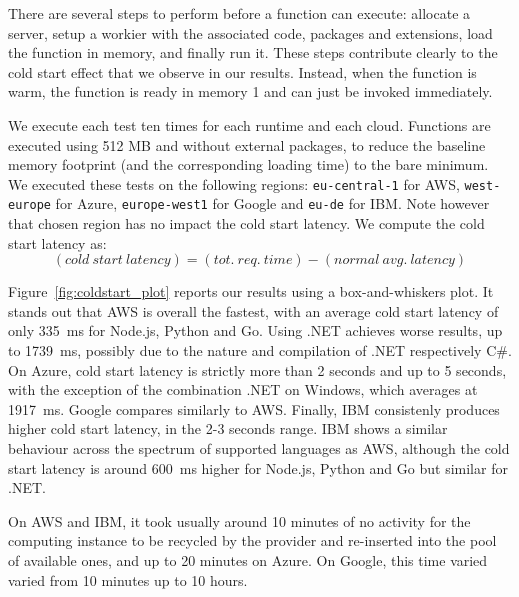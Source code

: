 There are several steps to perform before a function can execute: allocate a server, setup a workier with the associated code, packages and extensions, load the function in memory, and finally run it.
These steps contribute clearly to the cold start effect that we observe in our results.
Instead, when the function is warm, the function is ready in memory	1 and can just be invoked immediately. 

We execute each test ten times for each runtime and each cloud. 
Functions are executed using 512 \gls{MB} and without external packages, to reduce the baseline memory footprint (and the corresponding loading time) to the bare minimum.
We executed these tests on the following regions: \texttt{eu-central-1} for AWS,  \texttt{west-europe} for Azure,  \texttt{europe-west1} for Google and \texttt{eu-de} for IBM. 
Note however that chosen region has no impact the cold start latency. 
We compute the cold start latency as:
\begin{equation*}
(cold\ start\ latency) = (tot.\ req.\ time) - (normal\ avg.\ latency)
\end{equation*}

Figure~\ref{fig:coldstart_plot} reports our results using a box-and-whiskers plot.
It stands out that \gls{AWS} is overall the fastest, with an average cold start latency of only 335~ms for Node.js, Python and Go. 
Using .NET achieves worse results, up to 1739~ms, possibly due to the nature and compilation of .NET respectively C\#. 
On Azure, cold start latency is strictly more than 2 seconds and up to 5 seconds, with the exception of the combination .NET on Windows, which averages at 1917~ms. 
Google compares similarly to \gls{AWS}.
Finally, \gls{IBM} consistenly produces  higher cold start latency, in the 2-3 seconds range. 
\gls{IBM} shows a similar behaviour across the spectrum of supported languages as \gls{AWS},  although the cold start latency is around 600~ms higher for Node.js, Python and Go but similar for .NET.

On \gls{AWS} and \gls{IBM}, it took usually around 10 minutes of no activity for the computing instance to be recycled by the provider and re-inserted into the pool of available ones, and up to 20 minutes on Azure. 
On Google, this time varied varied from 10 minutes up to 10 hours.

